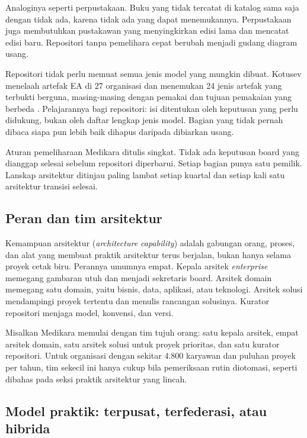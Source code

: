 Analoginya seperti perpustakaan. Buku yang tidak tercatat di katalog sama
saja dengan tidak ada, karena tidak ada yang dapat menemukannya.
Perpustakaan juga membutuhkan pustakawan yang menyingkirkan edisi lama dan
mencatat edisi baru. Repositori tanpa pemelihara cepat berubah menjadi
gudang diagram usang.

Repositori tidak perlu memuat semua jenis model yang mungkin dibuat. Kotusev
menelaah artefak EA di 27 organisasi dan menemukan 24 jenis artefak yang
terbukti berguna, masing-masing dengan pemakai dan tujuan pemakaian yang
berbeda \cite{kotusev2019}. Pelajarannya bagi repositori: isi ditentukan
oleh keputusan yang perlu didukung, bukan oleh daftar lengkap jenis model.
Bagian yang tidak pernah dibaca siapa pun lebih baik dihapus daripada
dibiarkan usang.

Aturan pemeliharaan Medikara ditulis singkat. Tidak ada keputusan board
yang dianggap selesai sebelum repositori diperbarui. Setiap bagian punya
satu pemilik. Lanskap arsitektur ditinjau paling lambat setiap kuartal dan
setiap kali satu arsitektur transisi selesai.

\subsection*{Peran dan tim arsitektur}

Kemampuan arsitektur (\textit{architecture capability}) adalah gabungan
orang, proses, dan alat yang membuat praktik arsitektur terus berjalan,
bukan hanya selama proyek cetak biru. Perannya umumnya empat. Kepala
arsitek \textit{enterprise} memegang gambaran utuh dan menjadi sekretaris
board. Arsitek domain memegang satu domain, yaitu bisnis, data, aplikasi,
atau teknologi. Arsitek solusi mendampingi proyek tertentu dan menulis
rancangan solusinya. Kurator repositori menjaga model, konvensi, dan versi.

Misalkan Medikara memulai dengan tim tujuh orang: satu kepala arsitek,
empat arsitek domain, satu arsitek solusi untuk proyek prioritas, dan satu
kurator repositori. Untuk organisasi dengan sekitar 4.800 karyawan dan
puluhan proyek per tahun, tim sekecil ini hanya cukup bila pemeriksaan rutin
diotomasi, seperti dibahas pada seksi praktik arsitektur yang lincah.

\subsection*{Model praktik: terpusat, terfederasi, atau hibrida}


